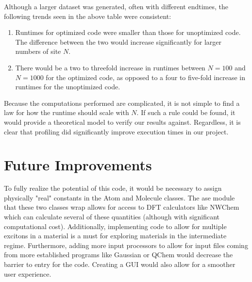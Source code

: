 \documentclass{article}
\begin{document}
Although a larger dataset was generated, often with different endtimes, the following trends seen in the above table were consistent: 
\begin{enumerate}
    \item Runtimes for optimized code were smaller than those for unoptimized code. The difference between the two would increase significantly for larger numbers of site $N$.
    \item There would be a two to threefold increase in runtimes between $N = 100$ and $N = 1000$ for the optimized code, as opposed to a four to five-fold increase in runtimes for the unoptimized code.
\end{enumerate}

Because the computations performed are complicated, it is not simple to find a law for how the runtime should scale with $N$. If such a rule could be found, it would provide a theoretical model to verify our results against. Regardless, it is clear that profiling did significantly improve execution times in our project.


\section{Future Improvements}

To fully realize the potential of this code, it would be necessary to assign physically "real" constants in the Atom and Molecule classes. The ase module that these two classes wrap allows for access to DFT calculators like NWChem which can calculate several of these quantities (although with significant computational cost). Additionally, implementing code to allow for multiple excitons in a material is a must for exploring materials in the intermediate regime. Furthermore, adding more input processors to allow for input files coming from more established programs like Gaussian or QChem would decrease the barrier to entry for the code. Creating a GUI would also allow for a smoother user experience.




\printbibliography
\end{document}

